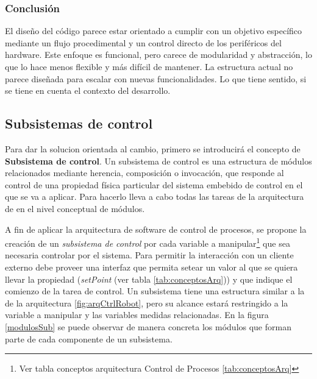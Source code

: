 \subsubsection*{Conclusión}

El diseño del código parece estar orientado a cumplir con un objetivo específico mediante un flujo procedimental y un control directo de los periféricos del hardware. Este enfoque es funcional, pero carece de modularidad y abstracción, lo que lo hace menos flexible y más difícil de mantener. La estructura actual no parece diseñada para escalar con nuevas funcionalidades. Lo que tiene sentido, si se tiene en cuenta el contexto del desarrollo.


\subsection{Subsistemas de control}

Para dar la solucion orientada al cambio, primero se introducirá el concepto de \textbf{Subsistema de control}. Un subsistema de control es una estructura de módulos relacionados mediante herencia, composición o invocación, que responde al control de una propiedad física particular del sistema embebido de control en el que se va a aplicar. Para hacerlo lleva a cabo todas las tareas de la arquitectura de  en el nivel conceptual de módulos. 

A fin de aplicar la arquitectura de software de control de procesos, se propone la creación de un \textit{subsistema de control} por cada variable a manipular\footnote{Ver tabla conceptos arquitectura Control de Procesos \ref{tab:conceptosArq}} que sea necesaria controlar por el sistema. Para permitir la interacción con un cliente externo debe proveer una interfaz que permita setear un valor al que se quiera llevar la propiedad (\textit{setPoint} (ver tabla \ref{tab:conceptosArq})) y que indique el comienzo de la tarea de control. Un subsistema tiene una estructura similar a la de la arquitectura \ref{fig:arqCtrlRobot}, pero su alcance estará restringido a la variable a manipular y las variables medidas relacionadas. En la figura \ref{modulosSub} se puede observar de manera concreta los módulos que forman parte de cada componente de un subsistema.


